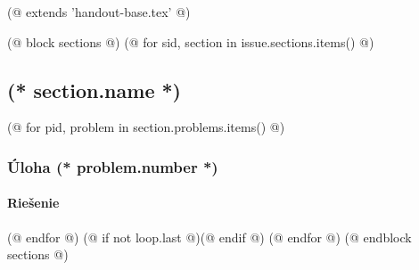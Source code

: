 (@ extends 'handout-base.tex' @)

(@ block sections @)
    (@ for sid, section in issue.sections.items() @)
        \subsection{(* section.name *)}
        (@ for pid, problem in section.problems.items() @)
            \subsubsection{Úloha (* problem.number *)}
            \paragraph{Riešenie}
        (@ endfor @)
        (@ if not loop.last @)\newpage(@ endif @)
    (@ endfor @)
(@ endblock sections @)
